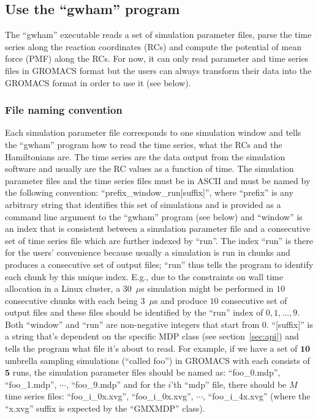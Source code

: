 \subsection{Use the ``gwham'' program}
The ``gwham'' executable reads a set of simulation parameter files, parse the
time series along the reaction coordinates (RCs) and compute the potential of
mean force (PMF) along the RCs. For now, it can only read parameter and 
time series files in GROMACS format but the users can always transform their 
data into the GROMACS format in order to use it (see below).

\subsubsection{File naming convention}\label{sec:fname}
Each simulation parameter file corresponds to one simulation window and tells
the ``gwham'' program how to read the time series, what the RCs and the
Hamiltonians are. The time series are the data output from the simulation
software and usually are the RC values as a function of time. The simulation
parameter files and the time series files must be in ASCII and must be named by
the following convention: ``prefix\_window\_run[suffix]'', where ``prefix'' is
any arbitrary string that identifies this set of simulations and is provided as
a command line argument to the ``gwham'' program (see below) and ``window'' is
an index that is consistent between a simulation parameter file and a
consecutive set of time series file which are further indexed by ``run''. The
index ``run'' is there for the users' convenience because usually a simulation
is run in chunks and produces a consecutive set of output files; ``run'' thus
tells the program to identify each chunk by this unique index. E.g., due to the
constraints on wall time allocation in a Linux cluster, a 30~$\mu$s simulation
might be performed in $10$ consecutive chunks with each being $3$~$\mu$s and
produce $10$ consecutive set of output files and these files should be
identified by the ``run'' index of $0,1,\dotsc,9$.  Both ``window'' and ``run''
are non-negative integers that start from 0. ``[suffix]'' is a string that's
dependent on the specific MDP class (see section~\ref{sec:api}) and tells the
program what file it's about to read.  For example, if we have a set of
$\mathbf{10}$ umbrella sampling simulations (``called foo'') in GROMACS with
each consists of $\mathbf{5}$ runs, the simulation parameter files should be
named as: ``foo\_0.mdp'', ``foo\_1.mdp'', $\cdots$, ``foo\_9.mdp'' and for the
$i$'th ``mdp'' file, there should be $M$ time series files: ``foo\_i\_0x.xvg'',
``foo\_i\_0x.xvg'', $\cdots$, ``foo\_i\_4x.xvg'' (where the ``x.xvg'' suffix is
expected by the ``GMXMDP'' class). 

